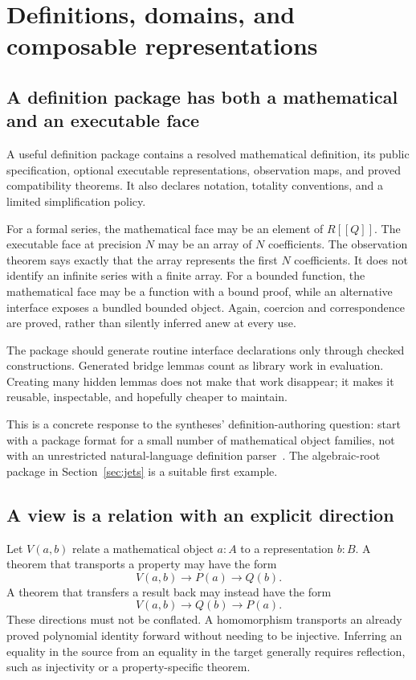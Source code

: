 \documentclass[11pt,letterpaper]{article}
\theoremstyle{definition}
\theoremstyle{remark}
\begin{document}
\section{Definitions, domains, and composable representations}
\label{sec:views}

\subsection{A definition package has both a mathematical and an executable face}
A useful definition package contains a resolved mathematical definition, its
public specification, optional executable representations, observation maps,
and proved compatibility theorems. It also declares notation, totality
conventions, and a limited simplification policy.

For a formal series, the mathematical face may be an element of $R[[Q]]$.
The executable face at precision $N$ may be an array of $N$ coefficients.
The observation theorem says exactly that the array represents the first $N$
coefficients. It does not identify an infinite series with a finite array.
For a bounded function, the mathematical face may be a function with a bound
proof, while an alternative interface exposes a bundled bounded object. Again,
coercion and correspondence are proved, rather than silently inferred anew
at every use.

The package should generate routine interface declarations only through checked
constructions. Generated bridge lemmas count as library work in evaluation.
Creating many hidden lemmas does not make that work disappear; it makes it
reusable, inspectable, and hopefully cheaper to maintain.

This is a concrete response to the syntheses' definition-authoring question:
start with a package format for a small number of mathematical object families,
not with an unrestricted natural-language definition parser~\cite{synthesis,blueprints}.
The algebraic-root package in Section~\ref{sec:jets} is a suitable first example.

\subsection{A view is a relation with an explicit direction}
Let $V(a,b)$ relate a mathematical object $a:A$ to a representation $b:B$.
A theorem that transports a property may have the form
\[
 V(a,b)\to P(a)\to Q(b).
\]
A theorem that transfers a result back may instead have the form
\[
 V(a,b)\to Q(b)\to P(a).
\]
These directions must not be conflated. A homomorphism transports an already
proved polynomial identity forward without needing to be injective. Inferring
an equality in the source from an equality in the target generally requires
reflection, such as injectivity or a property-specific theorem.
\end{document}
